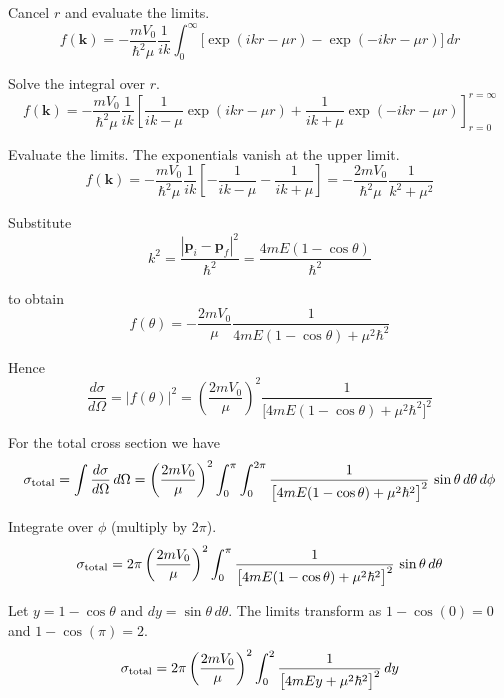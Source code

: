 Cancel $r$ and evaluate the limits.
\begin{equation*}
f(\mathbf k)=-\frac{mV_0}{\hbar^2\mu}\frac{1}{ik}
\int_0^\infty
\bigl[\exp(ikr-\mu r)-\exp(-ikr-\mu r)\bigr]
\,dr
\end{equation*}

Solve the integral over $r$.
\begin{equation*}
f(\mathbf k)=-\frac{mV_0}{\hbar^2\mu}
\frac{1}{ik}
\left[
\frac{1}{ik-\mu}
\exp(ikr-\mu r)
+\frac{1}{ik+\mu}
\exp(-ikr-\mu r)
\right]_{r=0}^{r=\infty}
\end{equation*}

Evaluate the limits. The exponentials vanish at the upper limit.
\begin{equation*}
f(\mathbf k)=-\frac{mV_0}{\hbar^2\mu}
\frac{1}{ik}
\left[
-\frac{1}{ik-\mu}
-\frac{1}{ik+\mu}
\right]
=-\frac{2mV_0}{\hbar^2\mu}\frac{1}{k^2+\mu^2}
\tag{1}
\end{equation*}

Substitute
\begin{equation*}
k^2=\frac{|\mathbf p_i-\mathbf p_f|^2}{\hbar^2}=\frac{4mE(1-\cos\theta)}{\hbar^2}
\end{equation*}

to obtain
\begin{equation*}
f(\theta)=-\frac{2mV_0}{\mu}\frac{1}{4mE(1-\cos\theta)+\mu^2\hbar^2}
\tag{2}
\end{equation*}

Hence
\begin{equation*}
\frac{d\sigma}{d\Omega}
=|f(\theta)|^2=\left(\frac{2mV_0}{\mu}\right)^2
\frac{1}{\bigl[4mE(1-\cos\theta)+\mu^2\hbar^2\bigr]^2}
\end{equation*}

For the total cross section we have
\begin{equation*}
\sigma_{\rm total}=\int\frac{d\sigma}{d\Omega}\,d\Omega
=\left(\frac{2mV_0}{\mu}\right)^2\int_0^\pi\int_0^{2\pi}
\frac{1}{\bigl[4mE(1-\cos\theta)+\mu^2\hbar^2\bigr]^2}\,\sin\theta\,d\theta\,d\phi
\end{equation*}

Integrate over $\phi$ (multiply by $2\pi$).
\begin{equation*}
\sigma_{\rm total}=2\pi\left(\frac{2mV_0}{\mu}\right)^2
\int_0^\pi\frac{1}{\bigl[4mE(1-\cos\theta)+\mu^2\hbar^2\bigr]^2}\,\sin\theta\,d\theta
\end{equation*}

Let $y=1-\cos\theta$ and $dy=\sin\theta\,d\theta$.
The limits transform as $1-\cos(0)=0$ and $1-\cos(\pi)=2$.
\begin{equation*}
\sigma_{\rm total}=2\pi\left(\frac{2mV_0}{\mu}\right)^2
\int_0^2\frac{1}{\bigl[4mEy+\mu^2\hbar^2\bigr]^2}\,dy
\end{equation*}

